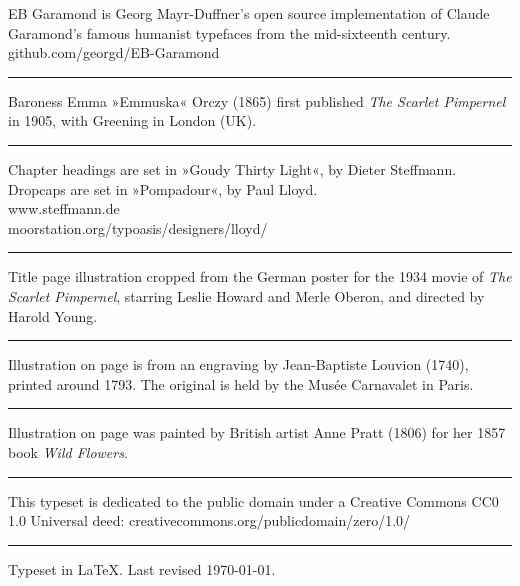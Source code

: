 \documentclass[
paper=5.5in:8.5in,
]{scrbook}
\begin{document}
\centering
EB Garamond is Georg Mayr-Duffner's open source implementation of Claude Garamond's famous humanist typefaces from the mid-sixteenth century. \\github.com/georgd/EB-Garamond

\rule{0.5\textwidth}{.4pt}

Baroness Emma »Emmuska« Orczy (1865) first published \textit{The Scarlet Pimpernel} in 1905, with Greening in London (UK).

\rule{0.5\textwidth}{.4pt}

Chapter headings are set in »Goudy Thirty Light«, by Dieter Steffmann. Dropcaps are set in »Pompadour«, by Paul Lloyd.\\www.steffmann.de\\moorstation.org/typoasis/designers/lloyd/

\rule{0.5\textwidth}{.4pt}

Title page illustration cropped from the German poster for the 1934 movie of \textit{The Scarlet Pimpernel}, starring Leslie Howard and Merle Oberon, and directed by Harold Young.

\rule{0.5\textwidth}{.4pt}

Illustration on page \pageref{guillotine} is from an engraving by Jean-Baptiste Louvion (1740), printed around 1793. The original is held by the Musée Carnavalet in Paris. 

\rule{0.5\textwidth}{.4pt}

Illustration on page \pageref{flowers} was painted by British artist Anne Pratt (1806) for her 1857 book \textit{Wild Flowers}. 

\rule{0.5\textwidth}{.4pt}

This typeset is dedicated to the public domain under a Creative Commons CC0 1.0 Universal deed: creativecommons.org/publicdomain/zero/1.0/

\rule{0.5\textwidth}{.4pt}

Typeset in \LaTeX{}. Last revised \today.
\enlargethispage{\baselineskip}
\thispagestyle{empty}
\end{document}
